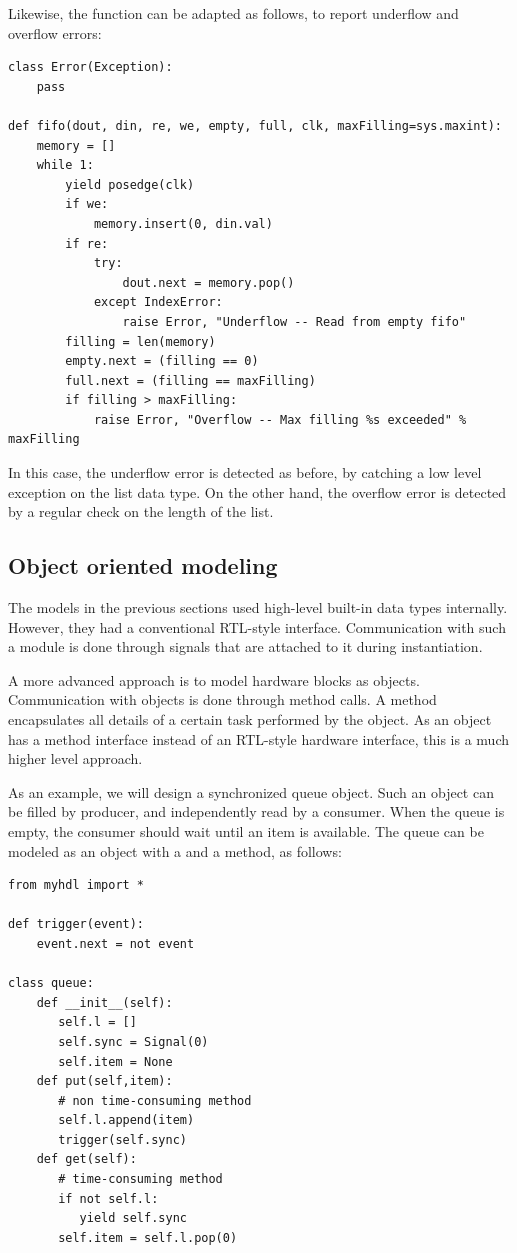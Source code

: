 Likewise, the  function can be adapted as follows, to
report underflow and overflow errors:

\begin{verbatim}
class Error(Exception):
    pass

def fifo(dout, din, re, we, empty, full, clk, maxFilling=sys.maxint):
    memory = []
    while 1:
        yield posedge(clk)
        if we:
            memory.insert(0, din.val)
        if re:
            try:
                dout.next = memory.pop()
            except IndexError:
                raise Error, "Underflow -- Read from empty fifo"
        filling = len(memory)
        empty.next = (filling == 0)
        full.next = (filling == maxFilling)
        if filling > maxFilling:
            raise Error, "Overflow -- Max filling %s exceeded" % maxFilling
\end{verbatim}

In this case, the underflow error is detected as before, by catching a
low level exception on the list data type. On the other hand, the
overflow error is detected by a regular check on the length of the
list.


\subsection{Object oriented modeling \label{model-obj}}

The models in the previous sections used high-level built-in data
types internally. However, they had a conventional RTL-style
interface.  Communication with such a module is done through signals
that are attached to it during instantiation.

A more advanced approach is to model hardware blocks as
objects. Communication with objects is done through method calls.
A method encapsulates all details of a certain task performed
by the object. As an object has a method interface instead
of an RTL-style hardware interface, this is a much 
higher level approach.

As an example, we will design a synchronized queue object. 
Such an object can be filled by producer, and independently
read by a consumer. When the queue is empty, the consumer
should wait until an item is available. The queue can be modeled
as an object with a  and a 
method, as follows:

\begin{verbatim}
from myhdl import *

def trigger(event):
    event.next = not event

class queue:
    def __init__(self):
       self.l = []
       self.sync = Signal(0)
       self.item = None
    def put(self,item):
       # non time-consuming method
       self.l.append(item)
       trigger(self.sync)
    def get(self):
       # time-consuming method
       if not self.l:
          yield self.sync
       self.item = self.l.pop(0)
\end{verbatim}

